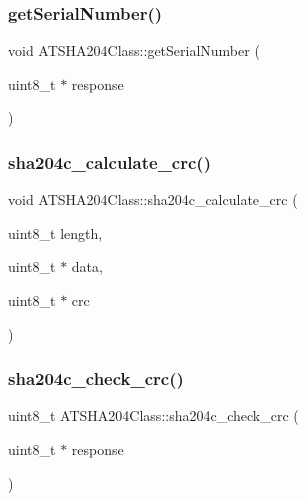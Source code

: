 \subsubsection{\texorpdfstring{get\+Serial\+Number()}{getSerialNumber()}}
{\footnotesize\ttfamily void A\+T\+S\+H\+A204\+Class\+::get\+Serial\+Number (\begin{DoxyParamCaption}\item[{uint8\+\_\+t $\ast$}]{response }\end{DoxyParamCaption})}

\mbox{\label{classATSHA204Class_a42b8beceec64c89148a9bb49b26f0fb1}} 
\subsubsection{\texorpdfstring{sha204c\+\_\+calculate\+\_\+crc()}{sha204c\_calculate\_crc()}}
{\footnotesize\ttfamily void A\+T\+S\+H\+A204\+Class\+::sha204c\+\_\+calculate\+\_\+crc (\begin{DoxyParamCaption}\item[{uint8\+\_\+t}]{length,  }\item[{uint8\+\_\+t $\ast$}]{data,  }\item[{uint8\+\_\+t $\ast$}]{crc }\end{DoxyParamCaption})\hspace{0.3cm}{\ttfamily [private]}}

\mbox{\label{classATSHA204Class_a30b1fad66d47a88848ebc6d74b66ec97}} 
\subsubsection{\texorpdfstring{sha204c\+\_\+check\+\_\+crc()}{sha204c\_check\_crc()}}
{\footnotesize\ttfamily uint8\+\_\+t A\+T\+S\+H\+A204\+Class\+::sha204c\+\_\+check\+\_\+crc (\begin{DoxyParamCaption}\item[{uint8\+\_\+t $\ast$}]{response }\end{DoxyParamCaption})\hspace{0.3cm}{\ttfamily [private]}}

